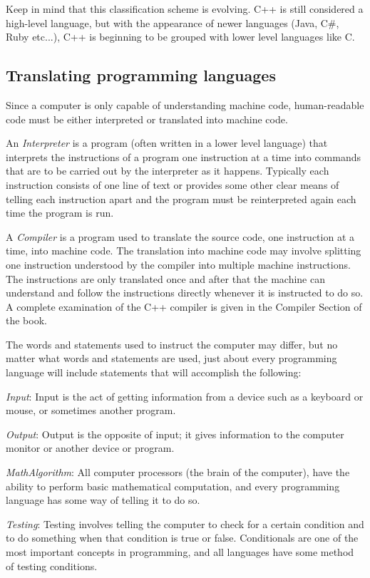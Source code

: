 Keep in mind that this classification scheme is evolving. C++ is still
considered a high-level language, but with the appearance of newer languages
(Java, C\#, Ruby etc...), C++ is beginning to be grouped with lower level
languages like C.

\subsection{Translating programming languages}
Since a computer is only capable of understanding machine code, human-readable
code must be either interpreted or translated into machine code.

An \textit{Interpreter} is a program (often written in a lower level language)
that interprets the instructions of a program one instruction at a time into
commands that are to be carried out by the interpreter as it happens. Typically
each instruction consists of one line of text or provides some other clear
means of telling each instruction apart and the program must be reinterpreted
again each time the program is run.

A \textit{Compiler} is a program used to translate the source code, one
instruction at a time, into machine code. The translation into machine code may
involve splitting one instruction understood by the compiler into multiple
machine instructions. The instructions are only translated once and after that
the machine can understand and follow the instructions directly whenever it is
instructed to do so. A complete examination of the C++ compiler is given in the
Compiler Section of the book.

The words and statements used to instruct the computer may differ, but no
matter what words and statements are used, just about every programming
language will include statements that will accomplish the following:

\textit{Input}: Input is the act of getting information from a device such as a
keyboard or mouse, or sometimes another program.

\textit{Output}: Output is the opposite of input; it gives information to the
computer monitor or another device or program. 

\textit{Math}\textit{Algorithm}: All computer processors (the brain of the
computer), have the ability to perform basic mathematical computation, and
every programming language has some way of telling it to do so. 

\textit{Testing}: Testing involves telling the computer to check for a certain
condition and to do something when that condition is true or false.
Conditionals are one of the most important concepts in programming, and all
languages have some method of testing conditions. 


